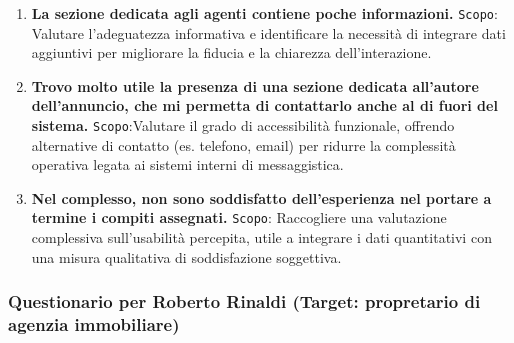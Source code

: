 \begin{enumerate}
	\item \textbf{La sezione dedicata agli agenti contiene poche informazioni.}
	\newline
	\texttt{Scopo}: Valutare l’adeguatezza informativa e identificare la necessità di integrare dati aggiuntivi per migliorare la fiducia e la chiarezza dell’interazione.
	
	\item \textbf{Trovo molto utile la presenza di una sezione dedicata all’autore dell’annuncio, che mi permetta di contattarlo anche al di fuori del sistema.}
	\newline
	\texttt{Scopo}:Valutare il grado di accessibilità funzionale, offrendo alternative di contatto (es. telefono, email) per ridurre la complessità operativa legata ai sistemi interni di messaggistica.
	
	\item \textbf{Nel complesso, non sono soddisfatto dell’esperienza nel portare a termine i compiti assegnati.}
	\newline
	\texttt{Scopo}: Raccogliere una valutazione complessiva sull’usabilità percepita, utile a integrare i dati quantitativi con una misura qualitativa di soddisfazione soggettiva.
	
\end{enumerate}

\vspace{0.5cm} %
\subsubsection*{Questionario per Roberto Rinaldi (Target: propretario di agenzia immobiliare)}
\vspace{0.5cm} %


